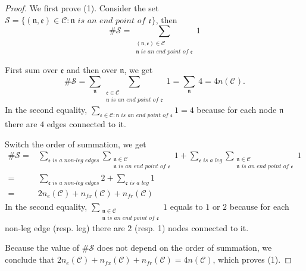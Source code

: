 \begin{proof}
We first prove (1). Consider the set $\mathcal{S}=\{(\mathfrak{n}, \mathfrak{e})\in \mathcal{C}: \mathfrak{n} \textit{ is an end point of }\mathfrak{e}\}$, then 
\begin{equation}
\#\mathcal{S}=\sum_{\substack{(\mathfrak{n}, \mathfrak{e})\in \mathcal{C}\\ \mathfrak{n} \textit{ is an end point of }\mathfrak{e}}} 1
\end{equation}

First sum over $\mathfrak{e}$ and then over $\mathfrak{n}$, we get 
\begin{equation}
\#\mathcal{S}=\sum_{\mathfrak{n}}\sum_{\substack{\mathfrak{e}\in \mathcal{C}\\ \mathfrak{n} \textit{ is an end point of }\mathfrak{e}}} 1=\sum_{\mathfrak{n}}\ 4=4n(\mathcal{C}).
\end{equation}
In the second equality, $\sum_{\mathfrak{e}\in \mathcal{C}: \mathfrak{n} \textit{ is an end point of }\mathfrak{e}} 1 =4$ because for each node $\mathfrak{n}$ there are $4$ edges connected to it.

Switch the order of summation, we get 
\begin{equation}
\begin{split}
\#\mathcal{S}=&\sum_{\mathfrak{e} \textit{ is a non-leg edges}}\sum_{\substack{\mathfrak{n}\in \mathcal{C}\\ \mathfrak{n} \textit{ is an end point of }\mathfrak{e}}} 1+\sum_{\mathfrak{e} \textit{ is a leg}}\sum_{\substack{\mathfrak{n}\in \mathcal{C}\\ \mathfrak{n} \textit{ is an end point of }\mathfrak{e}}} 1
\\
=&\sum_{\mathfrak{e} \textit{ is a non-leg edges}} 2+\sum_{\mathfrak{e} \textit{ is a leg}} 1
\\
=& 2n_e(\mathcal{C})+n_{fx}(\mathcal{C})+n_{\textit{fr}}(\mathcal{C})
\end{split}
\end{equation}
In the second equality, $\sum_{\substack{\mathfrak{n}\in \mathcal{C}\\ \mathfrak{n} \textit{ is an end point of }\mathfrak{e}}} 1$ equals to $1$ or $2$ because for each non-leg edge (resp. leg) there are $2$ (resp. 1) nodes connected to it.

Because the value of $\#\mathcal{S}$ does not depend on the order of summation, we conclude that $2n_e(\mathcal{C})+n_{fx}(\mathcal{C})+n_{\textit{fr}}(\mathcal{C})=4n(\mathcal{C})$, which proves (1).



\end{proof}
